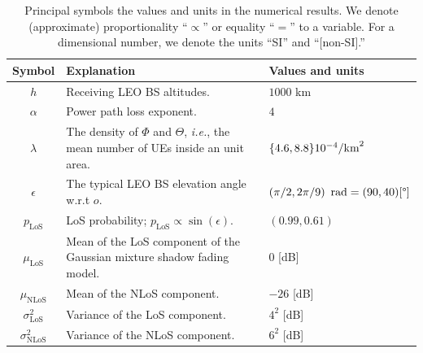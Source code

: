 \documentclass[lettersize,journal]{IEEEtran}
\newcommand{\rEarth}{R_{\oplus}}
\newcommand{\R}{\mathbb{R}}
\begin{document}
\begin{table}
   \captionsetup{size=footnotesize}
   \caption{Principal symbols the values and units in the numerical results. We denote (approximate) proportionality ``$\propto$'' or equality ``$=$'' to a variable. For a dimensional number, we denote the units ``SI'' and ``[non-SI].''}
     \label{table:parameters}
  \begin{center}
    \begin{tabular}{c|p{4.5cm}|p{1.9cm}}
      \toprule
      Symbol& Explanation &Values and units
      \\ 
      \hline 
      $h$ & Receiving LEO BS altitudes. &$1000$ km  \\
      $\alpha$ &Power path loss exponent.& $4$\\
      $\lambda$ & The density of $\Phi$ and $\Theta$, \textit{i.e.}, the mean number of UEs inside an unit area.&$\{4.6,8.8\}\break10^{-4}\text{/km}^2$\\
      $\epsilon$& The typical LEO BS elevation angle w.r.t $\textit{o}$.&$\left({\pi}/{2},{2\pi}/{9}\right)\text{ rad}\break=(90,40)[\degree]$\\
      $p_{\text{LoS}}$& LoS probability; $p_{\text{LoS}} \propto \sin(\epsilon)$. & $(0.99,0.61)$\\
      $\mu_{\text{LoS}}$& Mean of the LoS component of the Gaussian mixture shadow fading model. & $0$ [dB] \\
      $\mu_{\text{NLoS}}$& Mean of the NLoS component. & $-26$ [dB] \\
      $\sigma^2_{\text{LoS}}$& Variance of the LoS component. & $4^2$ [dB] \\
      $\sigma^2_{\text{NLoS}}$& Variance of the NLoS component. & $6^2$ [dB] \\

\end{tabular}
\end{center}
\end{table}
\end{document}
